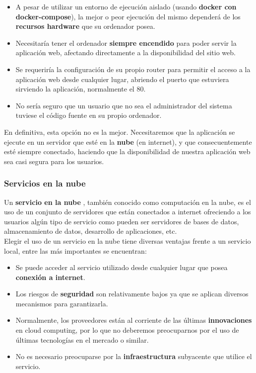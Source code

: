     \begin{itemize}
        \item A pesar de utilizar un entorno de ejecución aislado (usando \textbf{docker
        con docker-compose}), la mejor o peor ejecución del mismo dependerá de los
        \textbf{recursos hardware} que su ordenador posea.
        \item Necesitaría tener el ordenador \textbf{siempre encendido} para poder servir
        la aplicación web, afectando directamente a la disponibilidad del sitio web.
        \item Se requeriría la configuración de su propio router para permitir el acceso
        a la aplicación web desde cualquier lugar, abriendo el puerto que estuviera
        sirviendo la aplicación, normalmente el 80.
        \item No sería seguro que un usuario que no sea el administrador del sistema
        tuviese el código fuente en su propio ordenador.
    \end{itemize}

En definitiva, esta opción no es la mejor. Necesitaremos que la aplicación se ejecute en
un servidor que esté en la \textbf{nube} (en internet), y que consecuentemente esté
siempre conectado, haciendo que la disponibilidad de nuestra aplicación web sea casi
segura para los usuarios. \\

\subsubsection{Servicios en la nube}
Un \textbf{servicio en la nube} \cite{cloud-computing}, también conocido como computación
en la nube, es el uso de un conjunto de servidores que están conectados a internet
ofreciendo a los usuarios algún tipo de servicio como pueden ser servidores de bases de
datos, almacenamiento de datos, desarrollo de aplicaciones, etc. \\

Elegir el uso de un servicio en la nube tiene diversas ventajas frente a un servicio
local, entre las más importantes se encuentran:

    \begin{itemize}
        \item Se puede acceder al servicio utilizado desde cualquier lugar que posea
        \textbf{conexión a internet}.
        \item Los riesgos de \textbf{seguridad} son relativamente bajos ya que se aplican
        diversos mecanismos para garantizarla.
        \item Normalmente, los proveedores están al corriente de las últimas
        \textbf{innovaciones} en cloud computing, por lo que no deberemos preocuparnos por
        el uso de últimas tecnologías en el mercado o similar.
        \item No es necesario preocuparse por la \textbf{infraestructura} subyacente que
        utilice el servicio.
    \end{itemize}

